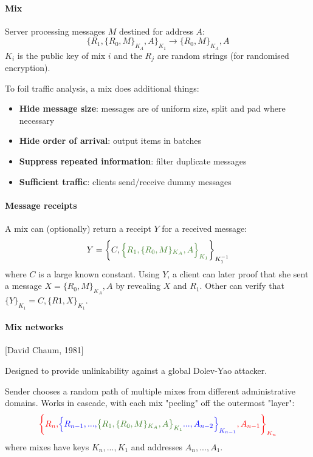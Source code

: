 \paragraph{Mix}
Server processing messages $M$ destined for address $A$:
$$ \Big\{ R_1, \{ R_0, M \}_{K_A}, A \Big\} _{K_1} \longrightarrow \{ R_0, M \}_{K_A}, A $$
$K_i$ is the public key of mix $i$ and the $R_j$ are random strings (for randomised encryption).

To foil traffic analysis, a mix does additional things:
\begin{itemize}
    \item \textbf{Hide message size}: messages are of uniform size, split and pad where necessary
    \item \textbf{Hide order of arrival}: output items in batches
    \item \textbf{Suppress repeated information}: filter duplicate messages
    \item \textbf{Sufficient traffic}: clients send/receive dummy messages
\end{itemize}

\paragraph{Message receipts} A mix can (optionally) return a receipt $Y$ for a received \textcolor{OliveGreen}{message}:
$$ Y = \bigg\{ C, \textcolor{OliveGreen}{ \Big\{ R_1, \{ R_0, M \}_{K_A}, A \Big\}_{K_1} } \bigg\} _{K_1^{-1}} $$
where $C$ is a large known constant. Using $Y$, a client can later proof that she sent a message $X = \{ R_0, M \}_{K_A}, A$ by revealing $X$ and $R_1$. Other can verify that $\{Y\}_{K_1} = C, \{ R1, X \}_{K_1}$.

\paragraph{Mix networks} [David Chaum, 1981]

Designed to provide unlinkability against a global Dolev-Yao attacker. %

Sender chooses a random path of multiple mixes from different administrative domains. Works in cascade, with each mix "peeling" off the outermost "layer":
$$
\textcolor{red}{\bigg\{ R_n,}
\textcolor{blue}{\Big\{ R_{n-1}, ..., }
\textcolor{OliveGreen}{ \big\{ R_1, \{ R_0, M \}_{K_A}, A \big\}_{K_1} }
\textcolor{blue}{..., A_{n-2} \Big\}_{K_{n-1}} }
\textcolor{red}{, A_{n-1} \bigg\}_{K_n}}
$$
where mixes have keys $K_n, ..., K_1$ and addresses $A_n, ..., A_1$.

